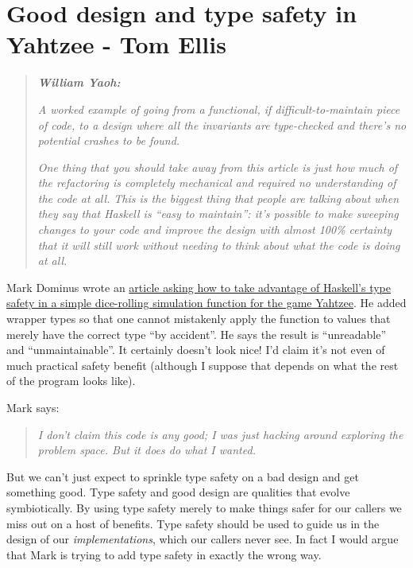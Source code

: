 \chapter{Good design and type safety in Yahtzee - Tom Ellis}
\label{sec:good_design_and_typesafety}


\begin{quotation}
\noindent\textit{\textbf{William Yaoh:}}

\textit{A worked example of going from a functional, if difficult-to-maintain piece of code, to a design where all the invariants are type-checked and there's no potential crashes to be found.}

\textit{One thing that you should take away from this article is just how much of the refactoring is completely mechanical and required no understanding of the code at all. This is the biggest thing that people are talking about when they say that Haskell is ``easy to maintain'': it's possible to make sweeping changes to your code and improve the design with almost 100\% certainty that it will still work without needing to think about what the code is doing at all.}
\end{quotation}
Mark Dominus wrote an \href{https://blog.plover.com/prog/haskell/type-markers.html}{article asking how to take advantage of Haskell's type safety in a simple dice-rolling simulation function for the game Yahtzee}. He added wrapper types so that one cannot mistakenly apply the function to values that merely have the correct type ``by accident''. He says the result is ``unreadable'' and ``unmaintainable''. It certainly doesn't look nice! I'd claim it's not even of much practical safety benefit (although I suppose that depends on what the rest of the program looks like).

\vspace{\baselineskip}

Mark says:
\begin{quotation}
\noindent \textit{I don't claim this code is any good; I was just hacking around exploring the problem space. But it does do what I wanted.}
\end{quotation} 
But we can't just expect to sprinkle type safety on a bad design and get something good. Type safety and good design are qualities that evolve symbiotically. By using type safety merely to make things safer for our callers we miss out on a host of benefits. Type safety should be used to guide us in the design of our \textit{implementations}, which our callers never see. In fact I would argue that Mark is trying to add type safety in exactly the wrong way.

